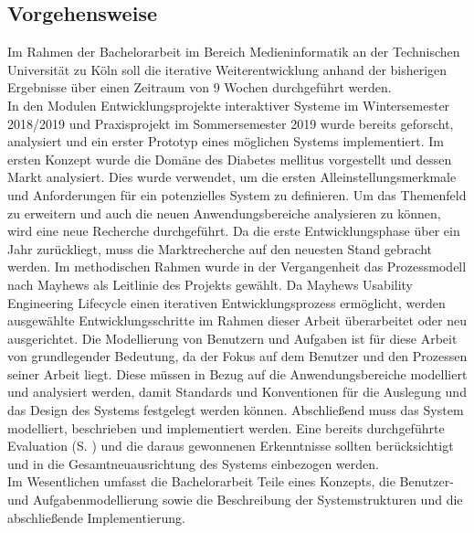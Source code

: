 \subsection{Vorgehensweise}
	Im Rahmen der Bachelorarbeit im Bereich Medieninformatik an der Technischen Universität zu Köln soll die iterative Weiterentwicklung anhand der bisherigen Ergebnisse über einen Zeitraum von 9 Wochen durchgeführt werden.\\
	In den Modulen \glqq Entwicklungsprojekte interaktiver Systeme\grqq{} im Wintersemester 2018/2019 und \glqq Praxisprojekt\grqq{} im Sommersemester 2019 wurde bereits geforscht, analysiert und ein erster Prototyp eines möglichen Systems implementiert. Im ersten Konzept wurde die Domäne des Diabetes mellitus vorgestellt und dessen Markt analysiert. Dies wurde verwendet, um die ersten Alleinstellungsmerkmale und Anforderungen für ein potenzielles System zu definieren. Um das Themenfeld zu erweitern und auch die neuen Anwendungsbereiche analysieren zu können, wird eine neue Recherche durchgeführt. Da die erste Entwicklungsphase über ein Jahr zurückliegt, muss die Marktrecherche auf den neuesten Stand gebracht werden. Im methodischen Rahmen wurde in der Vergangenheit das Prozessmodell nach Mayhews als Leitlinie des Projekts gewählt. Da Mayhews Usability Engineering Lifecycle einen iterativen Entwicklungsprozess ermöglicht, werden ausgewählte Entwicklungsschritte im Rahmen dieser Arbeit überarbeitet oder neu ausgerichtet. Die Modellierung von Benutzern und Aufgaben ist für diese Arbeit von grundlegender Bedeutung, da der Fokus auf dem Benutzer und den Prozessen seiner Arbeit liegt. Diese müssen in Bezug auf die Anwendungsbereiche modelliert und analysiert werden, damit Standards und Konventionen für die Auslegung und das Design des Systems festgelegt werden können.  Abschließend muss das System modelliert, beschrieben und implementiert werden. Eine bereits durchgeführte Evaluation (S. \pageref{section:Evaluation}) und die daraus gewonnenen Erkenntnisse sollten berücksichtigt und in die Gesamtneuausrichtung des Systems einbezogen werden.\\
	Im Wesentlichen umfasst die Bachelorarbeit Teile eines Konzepts, die Benutzer- und Aufgabenmodellierung sowie die Beschreibung der Systemstrukturen und die abschließende Implementierung. 

